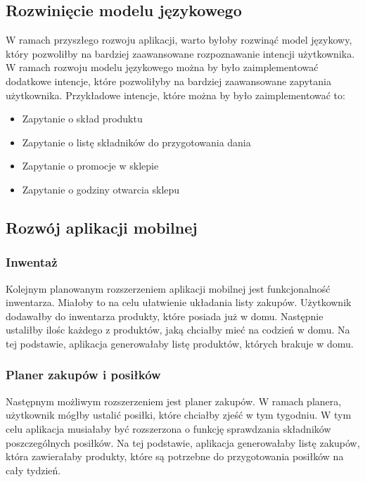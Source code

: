 \subsection{Rozwinięcie modelu językowego}
W ramach przyszłego rozwoju aplikacji, warto byłoby rozwinąć model językowy, który pozwoliłby na bardziej zaawansowane rozpoznawanie intencji użytkownika. W ramach rozwoju modelu językowego można by było zaimplementować dodatkowe intencje, które pozwoliłyby na bardziej zaawansowane zapytania użytkownika. Przykładowe intencje, które można by było zaimplementować to:
\begin{itemize}
    \item Zapytanie o skład produktu
    \item Zapytanie o listę składników do przygotowania dania
    \item Zapytanie o promocje w sklepie
    \item Zapytanie o godziny otwarcia sklepu
\end{itemize}


\subsection{Rozwój aplikacji mobilnej}

\subsubsection{Inwentaż}

Kolejnym planowanym rozszerzeniem aplikacji mobilnej jest funkcjonalność inwentarza. Miałoby to na celu ułatwienie układania listy zakupów. Użytkownik dodawałby do inwentarza produkty, które posiada już w domu. Następnie ustaliłby ilośc każdego z produktów, jaką chciałby mieć na codzień w domu.
Na tej podstawie, aplikacja generowałaby listę produktów, których brakuje w domu. 

\subsubsection{Planer zakupów i posiłków}

Następnym możliwym rozszerzeniem jest planer zakupów. W ramach planera, użytkownik mógłby ustalić posiłki, które chciałby zjeść w tym tygodniu. W tym celu aplikacja musiałaby być rozszerzona o funkcję sprawdzania składników poszczególnych posiłków. Na tej podstawie, aplikacja generowałaby listę zakupów, która zawierałaby produkty, które są potrzebne do przygotowania posiłków na cały tydzień.